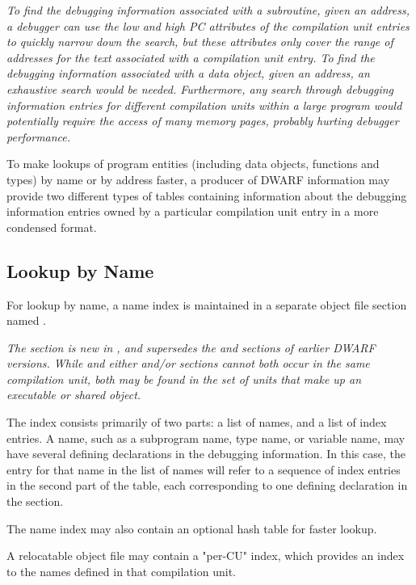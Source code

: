 \textit{To find the debugging information associated with a subroutine,
given an address, a debugger can use the low and high PC
attributes of the compilation unit entries to quickly narrow
down the search, but these attributes only cover the range
of addresses for the text associated with a compilation unit
entry. To find the debugging information associated with a
data object, given an address, an exhaustive search would be
needed. Furthermore, any search through debugging information
entries for different compilation units within a large program
would potentially require the access of many memory pages,
probably hurting debugger performance.}

To make lookups of program entities (including data objects, 
functions and types) by name or by address faster, a producer 
of DWARF information may provide two different types of tables
containing information about the debugging information
entries owned by a particular compilation unit entry in a
more condensed format.

\subsection{Lookup by Name}
For lookup by name, a name index is maintained in a separate
object file section named \dotdebugnames{}. 

\textit{The \dotdebugnames{} section is new in \DWARFVersionV,
and supersedes the \dotdebugpubnames{} and \dotdebugpubtypes{}
sections of earlier DWARF versions. While \dotdebugnames{} and
either \dotdebugpubnames{} and/or \dotdebugpubtypes{} sections
cannot both occur in the same compilation unit, both may be
found in the set of units that make up an executable or shared
object.}

The index consists
primarily of two parts: a list of names, and a list of index
entries. A name, such as a subprogram name, type name, or
variable name, may have several defining declarations in the
debugging information. In this case, the entry for that name in
the list of names will refer to a sequence of index entries in
the second part of the table, each corresponding to one defining
declaration in the \dotdebuginfo{} section.

The name index may also contain an optional hash table for faster
lookup.

A relocatable object file may contain a "per-CU" index, which
provides an index to the names defined in that compilation
unit.

